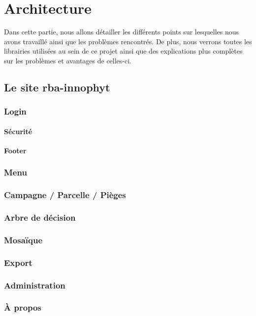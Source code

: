 \documentclass[twoside]{EPURapport}
\begin{document}
\chapter{Architecture}

Dans cette partie, nous allons détailler les différents points sur lesquelles nous avons travaillé ainsi que les problèmes rencontrés. De plus, nous verrons toutes les librairies utilisées au sein de ce projet ainsi que des explications plus complètes sur les problèmes et avantages de celles-ci.

	\section{Le site rba-innophyt}
	
		\subsection{Login}
			\subsubsection{Sécurité}
			\subsubsection{Footer}
		\subsection{Menu}
		\subsection{Campagne / Parcelle / Pièges}
		\subsection{Arbre de décision}
		\subsection{Mosaïque}
		\subsection{Export}
		\subsection{Administration}
		\subsection{À propos}
\end{document}
